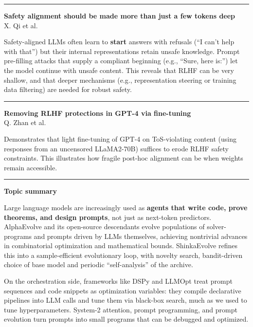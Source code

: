 \documentclass[a5paper]{article}
\def\subsection#1{{\par\bigskip\goodbreak\large\bfseries #1\par}}
\begin{document}
\begin{center}\rule{0.5\linewidth}{0.5pt}\end{center}

\textbf{Safety alignment should be made more than just a few tokens
deep}\\
X. Qi et al.

Safety-aligned LLMs often learn to \textbf{start} answers with refusals
(``I can't help with that'') but their internal representations retain
unsafe knowledge. Prompt pre-filling attacks that supply a compliant
beginning (e.g., ``Sure, here is:'') let the model continue with unsafe
content. This reveals that RLHF can be very shallow, and that deeper
mechanisms (e.g., representation steering or training data filtering)
are needed for robust safety.

\begin{center}\rule{0.5\linewidth}{0.5pt}\end{center}

\textbf{Removing RLHF protections in GPT-4 via fine-tuning}\\
Q. Zhan et al.

Demonstrates that light fine-tuning of GPT-4 on ToS-violating content
(using responses from an uncensored LLaMA2-70B) suffices to erode RLHF
safety constraints. This illustrates how fragile post-hoc alignment can
be when weights remain accessible.

\begin{center}\rule{0.5\linewidth}{0.5pt}\end{center}

\subsection{Topic summary}\label{topic-summary-3}

Large language models are increasingly used as \textbf{agents that write
code, prove theorems, and design prompts}, not just as next-token
predictors. AlphaEvolve and its open-source descendants evolve
populations of solver-programs and prompts driven by LLMs themselves,
achieving nontrivial advances in combinatorial optimization and
mathematical bounds. ShinkaEvolve refines this into a sample-efficient
evolutionary loop, with novelty search, bandit-driven choice of base
model and periodic ``self-analysis'' of the archive.

On the orchestration side, frameworks like DSPy and LLMOpt treat prompt
sequences and code snippets as optimization variables: they compile
declarative pipelines into LLM calls and tune them via black-box search,
much as we used to tune hyperparameters. System-2 attention, prompt
programming, and prompt evolution turn prompts into small programs that
can be debugged and optimized.
\end{document}
